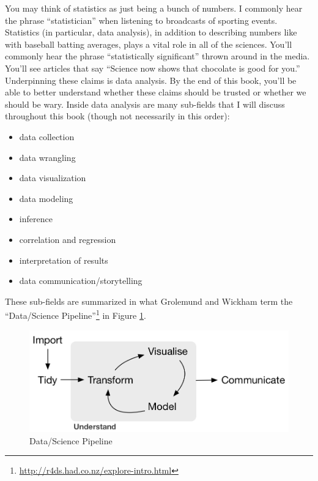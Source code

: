 \documentclass[
  12pt, krantz2,
]{krantz}
\providecommand{\tightlist}{%
  \setlength{\itemsep}{0pt}\setlength{\parskip}{0pt}}
\renewcommand{\href}[2]{#2\footnote{\url{#1}}}
\begin{document}
You may think of statistics as just being a bunch of numbers. I commonly hear the phrase ``statistician'' when listening to broadcasts of sporting events. Statistics (in particular, data analysis), in addition to describing numbers like with baseball batting averages, plays a vital role in all of the sciences. You'll commonly hear the phrase ``statistically significant'' thrown around in the media. You'll see articles that say ``Science now shows that chocolate is good for you.'' Underpinning these claims is data analysis. By the end of this book, you'll be able to better understand whether these claims should be trusted or whether we should be wary. Inside data analysis are many sub-fields that I will discuss throughout this book (though not necessarily in this order):

\begin{itemize}
\tightlist
\item
  data collection
\item
  data wrangling
\item
  data visualization
\item
  data modeling
\item
  inference
\item
  correlation and regression
\item
  interpretation of results
\item
  data communication/storytelling
\end{itemize}

These sub-fields are summarized in what Grolemund and Wickham term the \href{http://r4ds.had.co.nz/explore-intro.html}{``Data/Science Pipeline''} in Figure \ref{fig:pipeline-figure}.

\begin{figure}

{\centering \includegraphics[width=\textwidth]{images/tidy1} 

}

\caption{Data/Science Pipeline}\label{fig:pipeline-figure}
\end{figure}
\end{document}
